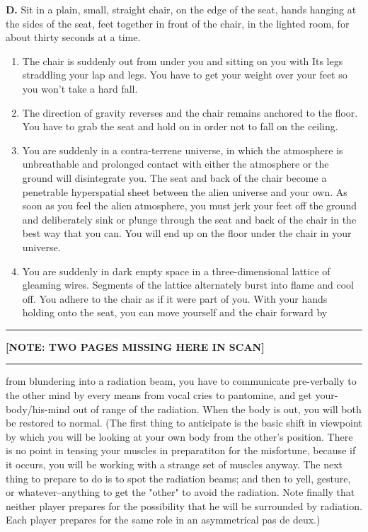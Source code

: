 \documentclass[10pt,twoside,draft]{memoir}
\begin{document}
{{\textbf{D.} Sit in a plain, small, straight chair, on the edge of the seat, hands 
hanging at the sides of the seat, feet together in front of the chair, in the 
lighted room, for about thirty seconds at a time. 

\begin{enumerate}
\item The chair is suddenly out from under you and sitting on you with Its legs 
straddling your lap and legs. You have to get your weight over your feet so 
you won't take a hard fall. 

\item The direction of gravity reverses and the chair remains anchored to the 
floor. You have to grab the seat and hold on in order not to fall on the 
ceiling. 

\item You are suddenly in a contra-terrene universe, in which the atmosphere is 
unbreathable and prolonged contact with either the atmosphere or the 
ground will disintegrate you. The seat and back of the chair become a 
penetrable hyperspatial sheet between the alien universe and your own. As 
soon as you feel the alien atmosphere, you must jerk your feet off the 
ground and deliberately sink or p!unge through the seat and back of the chair 
in the best way that you can. You will end up on the floor under the chair in 
your universe. 

\item You are suddenly in dark empty space in a three-dimensional lattice of 
gleaming wires. Segments of the lattice alternately burst into flame and cool 
off. You adhere to the chair as if it were part of you. With your hands 
holding onto the seat, you can move yourself and the chair forward by 

\end{enumerate}

\plainbreak{2}

\textbf{[NOTE: TWO PAGES MISSING HERE IN SCAN]}

\plainbreak{2}

from blundering into a radiation beam, you have to communicate 
pre-verbally to the other mind by every means from vocal cries to 
pantomine, and get your-body/his-mind out of range of the radiation. When 
the body is out, you will both be restored to normal. (The first thing to 
anticipate is the basic shift in viewpoint by which you will be looking at 
your own body from the other's position. There is no point in tensing your 
muscles in preparatiton for the misfortune, because if it occurs, you will be 
working with a strange set of muscles anyway. The next thing to prepare to 
do is to spot the radiation beams; and then to yell, gesture, or 
whatever--anything to get the "other" to avoid the radiation. Note finally 
that neither player prepares for the possibility that he will be surrounded by 
radiation. Each player prepares for the same role in an asymmetrical pas de 
deux.) 

}}
\end{document}
